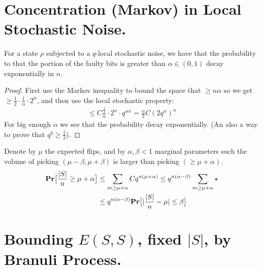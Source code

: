 \documentclass[manuscript,screen,review]{acmart}
\begin{document}
\section{Concentration (Markov) in Local Stochastic Noise.} 


\begin{claim}
  \label{calim:markov}
  For a state $\rho$ subjected to a $q$-local stochastic noise, we have that the probability to that the portion of the faulty bits is greater than $\alpha \in \left( 0, 1 \right)$ decay exponentially in $n$.
\end{claim}

\begin{proof}
First use the Markov inequality to bound the space that $ \ge n\alpha $ so we get $\ge \frac{1}{2} \cdot \frac{1}{\alpha} \cdot 2^{n}$, and then use the local stochastic property:   
\begin{equation*}
  \begin{split}
    \le C \frac{ \frac{1}{2} }{ \alpha } \cdot 2^{n} \cdot q^{\alpha n} = \frac{\alpha}{2} C \left( 2 q^{\alpha} \right)^{n}
  \end{split}
\end{equation*}
For big enough $\alpha$ we see that the probability decay exponentially. (An also a way to prove that $q^{q} \ge \frac{1}{2}$). 

\end{proof}


Denote by $\mu$ the expected flips, and by $\alpha,\beta < 1$ marginal parameters such the volume of picking $(\mu - \beta, \mu + \beta)$ is larger than picking $( \ge \mu + \alpha)$. 
\begin{equation*}
  \begin{split}
    \mathbf{Pr} \big[  \frac{|S|}{n} \ge \mu + \alpha  \big]  & \le \sum_{m \ge \mu + \alpha } Cq^{n(\mu + \alpha)} \le q^{n(\alpha - \beta) }  \sum_{m \ge \mu + \alpha } \star \\ 
      & \le  q^{n(\alpha - \beta) } \mathbf{Pr} \big[   |\frac{|S|}{n} - \mu | \le \beta    \big] 
  \end{split}
\end{equation*}
\section{Bounding $E(S,S)$, fixed $|S|$, by Branuli Process. } 
\end{document}
